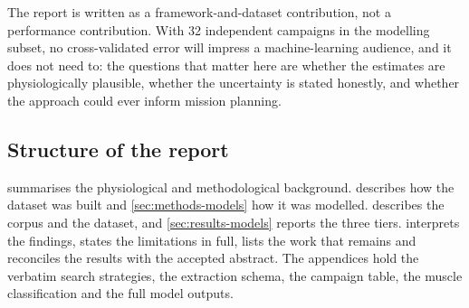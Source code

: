 The report is written as a framework-and-dataset contribution, not a performance contribution. With 32 independent
campaigns in the modelling subset, no cross-validated error will impress a machine-learning audience, and it does
not need to: the questions that matter here are whether the estimates are physiologically plausible, whether the
uncertainty is stated honestly, and whether the approach could ever inform mission planning.

\subsection{Structure of the report}

 summarises the physiological and methodological background. 
describes how the dataset was built and \cref{sec:methods-models} how it was modelled. 
describes the corpus and the dataset, and \cref{sec:results-models} reports the three tiers.
 interprets the findings, states the limitations in full, lists the work that remains and
reconciles the results with the accepted abstract. The appendices hold the verbatim search strategies, the
extraction schema, the campaign table, the muscle classification and the full model outputs.
